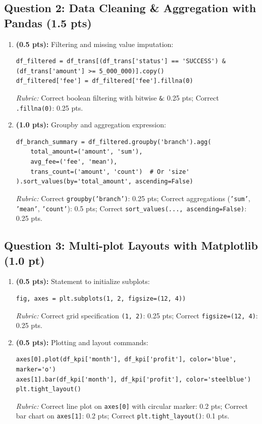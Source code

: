 \documentclass[11pt,a4paper]{article}
\begin{document}
\subsection*{Question 2: Data Cleaning \& Aggregation with Pandas (1.5 pts)}
\begin{enumerate}[label=\textbf{\alph*)}]
  \item \textbf{(0.5 pts):} Filtering and missing value imputation:
\begin{lstlisting}
df_filtered = df_trans[(df_trans['status'] == 'SUCCESS') & (df_trans['amount'] >= 5_000_000)].copy()
df_filtered['fee'] = df_filtered['fee'].fillna(0)
\end{lstlisting}
  \textit{Rubric:} Correct boolean filtering with bitwise \texttt{\&}: 0.25 pts; Correct \texttt{.fillna(0)}: 0.25 pts.

  \item \textbf{(1.0 pts):} Groupby and aggregation expression:
\begin{lstlisting}
df_branch_summary = df_filtered.groupby('branch').agg(
    total_amount=('amount', 'sum'),
    avg_fee=('fee', 'mean'),
    trans_count=('amount', 'count')  # Or 'size'
).sort_values(by='total_amount', ascending=False)
\end{lstlisting}
  \textit{Rubric:} Correct \texttt{groupby('branch')}: 0.25 pts; Correct aggregations (\texttt{'sum'}, \texttt{'mean'}, \texttt{'count'}): 0.5 pts; Correct \texttt{sort\_values(..., ascending=False)}: 0.25 pts.
\end{enumerate}

\subsection*{Question 3: Multi-plot Layouts with Matplotlib (1.0 pt)}
\begin{enumerate}[label=\textbf{\alph*)}]
  \item \textbf{(0.5 pts):} Statement to initialize subplots:
\begin{lstlisting}
fig, axes = plt.subplots(1, 2, figsize=(12, 4))
\end{lstlisting}
  \textit{Rubric:} Correct grid specification \texttt{(1, 2)}: 0.25 pts; Correct \texttt{figsize=(12, 4)}: 0.25 pts.

  \item \textbf{(0.5 pts):} Plotting and layout commands:
\begin{lstlisting}
axes[0].plot(df_kpi['month'], df_kpi['profit'], color='blue', marker='o')
axes[1].bar(df_kpi['month'], df_kpi['profit'], color='steelblue')
plt.tight_layout()
\end{lstlisting}
  \textit{Rubric:} Correct line plot on \texttt{axes[0]} with circular marker: 0.2 pts; Correct bar chart on \texttt{axes[1]}: 0.2 pts; Correct \texttt{plt.tight\_layout()}: 0.1 pts.
\end{enumerate}
\end{document}

